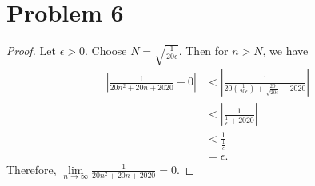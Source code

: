 \documentclass{article}
\begin{document}
\section*{Problem 6}
\begin{proof}
	Let $\epsilon >0$. Choose $N=\sqrt{\frac{1}{20\epsilon}}$. Then for $n > N$, we have
	\begin{align}
		\left|\frac{1}{20n^2+20n + 2020}-0\right| &< \left|\frac{1}{20\left(\frac{1}{20\epsilon}\right) + \frac{20}{\sqrt{20\epsilon}} + 2020}\right| \\
		&<\left|\frac{1}{\frac{1}{\epsilon}+2020}\right| \\
		&< \frac{1}{\frac{1}{\epsilon}} \\
		&= \epsilon.
	\end{align}
	Therefore, $\lim\limits_{n\to\infty}\frac{1}{20n^2+20n+2020} = 0$.
\end{proof}
\end{document}
